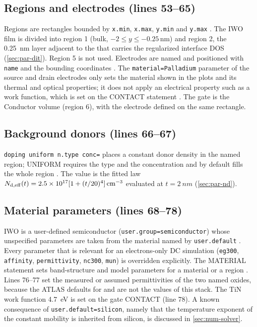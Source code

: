 \subsection{Regions and electrodes (lines 53--65)}

Regions are rectangles bounded by \texttt{x.min}, \texttt{x.max}, \texttt{y.min} and \texttt{y.max}
\citep[p.~1559]{AtlasManual}. The IWO film is divided into region 1 (bulk, $-2 \le y \le -0.25$\,nm) and region 2, the
\SI{0.25}{nm} layer adjacent to the \AlO{} that carries the regularized interface DOS (\cref{sec:par-dit}). Region 5 is
not used. Electrodes are named and positioned with \texttt{name} and the bounding coordinates
\citep[pp.~1207--1209]{AtlasManual}. The \texttt{material=Palladium} parameter of the source and drain electrodes only
sets the material shown in the plots and its thermal and optical properties; it does not apply an electrical property
such as a work function, which is set on the CONTACT statement \citep[p.~1208]{AtlasManual}. The gate is the Conductor
volume (region 6), with the electrode defined on the same rectangle.

\subsection{Background donors (lines 66--67)}

\texttt{doping uniform n.type conc=} places a constant donor density in the named region; UNIFORM requires the type
and the concentration and by default fills the whole region \citep[p.~1189]{AtlasManual}. The value is the fitted law
$N_{\mathrm{d,eff}}(t) = 2.5\times10^{17}[1+(t/20)^4]\,\mathrm{cm}^{-3}$ evaluated at $t = \SI{2}{nm}$ (\cref{sec:par-nd}).

\subsection{Material parameters (lines 68--78)}

IWO is a user-defined semiconductor (\texttt{user.group=semiconductor}) whose unspecified parameters are taken from the
material named by \texttt{user.default} \citep[p.~1366]{AtlasManual}. Every parameter that is relevant for an
electrons-only DC simulation (\texttt{eg300}, \texttt{affinity}, \texttt{permittivity}, \texttt{nc300}, \texttt{mun})
is overridden explicitly. The MATERIAL statement sets band-structure and model parameters for a material or a region
\citep[p.~1336]{AtlasManual}. Lines 76--77 set the measured or assumed permittivities of the two named oxides, because
the ATLAS defaults for \AlO{} and \HfO{} are not the values of this stack. The TiN work function \SI{4.7}{eV} is set on
the gate CONTACT (line 78). A known consequence of \texttt{user.default=silicon}, namely that the temperature exponent
of the constant mobility is inherited from silicon, is discussed in \cref{sec:num-solver}.

